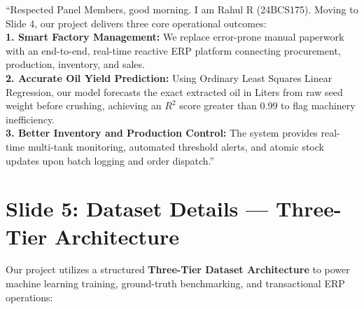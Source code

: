 \documentclass[11pt,a4paper]{article}
\begin{document}
\begin{speechbox}
``Respected Panel Members, good morning. I am Rahul R (24BCS175). Moving to Slide 4, our project delivers three core operational outcomes:\\
\textbf{1. Smart Factory Management:} We replace error-prone manual paperwork with an end-to-end, real-time reactive ERP platform connecting procurement, production, inventory, and sales.\\
\textbf{2. Accurate Oil Yield Prediction:} Using Ordinary Least Squares Linear Regression, our model forecasts the exact extracted oil in Liters from raw seed weight before crushing, achieving an $R^2$ score greater than 0.99 to flag machinery inefficiency.\\
\textbf{3. Better Inventory and Production Control:} The system provides real-time multi-tank monitoring, automated threshold alerts, and atomic stock updates upon batch logging and order dispatch.''
\end{speechbox}

\newpage

\section{Slide 5: Dataset Details --- Three-Tier Architecture}

Our project utilizes a structured \textbf{Three-Tier Dataset Architecture} to power machine learning training, ground-truth benchmarking, and transactional ERP operations:
\end{document}
